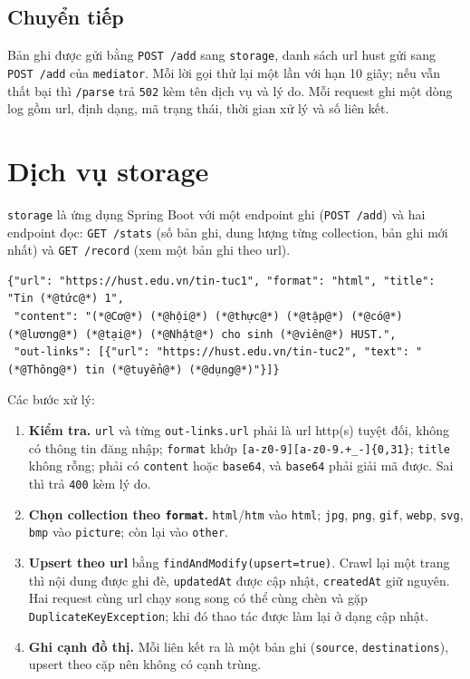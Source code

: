 \documentclass[12pt,a4paper]{report}
\begin{document}
\subsection{Chuyển tiếp}

Bản ghi được gửi bằng \texttt{POST /add} sang \texttt{storage}, danh sách url hust gửi sang \texttt{POST /add} của
\texttt{mediator}. Mỗi lời gọi thử lại một lần với hạn 10 giây; nếu vẫn thất bại thì \texttt{/parse} trả \texttt{502}
kèm tên dịch vụ và lý do. Mỗi request ghi một dòng log gồm url, định dạng, mã trạng thái, thời gian xử lý và số liên
kết.

\section{Dịch vụ storage}

\texttt{storage} là ứng dụng Spring Boot với một endpoint ghi (\texttt{POST /add}) và hai endpoint đọc:
\texttt{GET /stats} (số bản ghi, dung lượng từng collection, bản ghi mới nhất) và \texttt{GET /record} (xem một bản
ghi theo url).

\begin{lstlisting}[caption={Body của POST /add trên storage}]
{"url": "https://hust.edu.vn/tin-tuc1", "format": "html", "title": "Tin (*@tức@*) 1",
 "content": "(*@Cơ@*) (*@hội@*) (*@thực@*) (*@tập@*) (*@có@*) (*@lương@*) (*@tại@*) (*@Nhật@*) cho sinh (*@viên@*) HUST.",
 "out-links": [{"url": "https://hust.edu.vn/tin-tuc2", "text": "(*@Thông@*) tin (*@tuyển@*) (*@dụng@*)"}]}
\end{lstlisting}

Các bước xử lý:

\begin{enumerate}
  \item \textbf{Kiểm tra.} \texttt{url} và từng \texttt{out-links.url} phải là url http(s) tuyệt đối, không có thông tin
        đăng nhập; \texttt{format} khớp \texttt{[a-z0-9][a-z0-9.+\_\allowbreak{}-]\{0,31\}}; \texttt{title} không rỗng; phải có
        \texttt{content} hoặc \texttt{base64}, và \texttt{base64} phải giải mã được. Sai thì trả \texttt{400} kèm lý do.
  \item \textbf{Chọn collection theo \texttt{format}.} \texttt{html}/\texttt{htm} vào \texttt{html}; \texttt{jpg},
        \texttt{png}, \texttt{gif}, \texttt{webp}, \texttt{svg}, \texttt{bmp} vào \texttt{picture}; còn lại vào
        \texttt{other}.
  \item \textbf{Upsert theo url} bằng \texttt{findAndModify(upsert=true)}. Crawl lại một trang thì nội dung được ghi đè,
        \texttt{updatedAt} được cập nhật, \texttt{createdAt} giữ nguyên. Hai request cùng url chạy song song có thể cùng
        chèn và gặp \texttt{DuplicateKeyException}; khi đó thao tác được làm lại ở dạng cập nhật.
  \item \textbf{Ghi cạnh đồ thị.} Mỗi liên kết ra là một bản ghi (\texttt{source}, \texttt{destinations}), upsert theo
        cặp nên không có cạnh trùng.
\end{enumerate}
\end{document}
